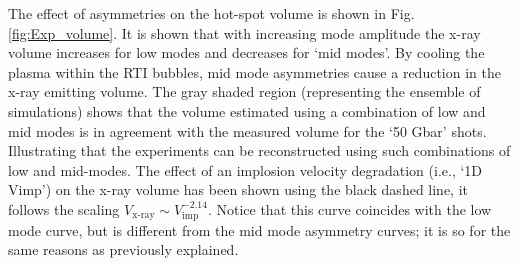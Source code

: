 \documentclass[aip,reprint]{revtex4-1}
\begin{document}
The effect of asymmetries on the hot-spot volume is shown in Fig. \ref{fig:Exp_volume}. It is shown that with increasing mode amplitude the x-ray volume increases for low modes and decreases for `mid modes'. By cooling the plasma within the RTI bubbles, mid mode asymmetries cause a reduction in the x-ray emitting volume. The gray shaded region (representing the ensemble of simulations) shows that the volume estimated using a combination of low and mid modes is in agreement with the measured volume for the `50 Gbar' shots. Illustrating that the experiments can be reconstructed using such combinations of low and mid-modes. The effect of an implosion velocity degradation (i.e., `1D Vimp') on the x-ray volume has been shown using the black dashed line, it follows the scaling $V_\text{x-ray} \sim V_\text{imp}^{-2.14}$. Notice that this curve coincides with the low mode curve, but is different from the mid mode asymmetry curves; it is so for the same reasons as previously explained.
\end{document}
